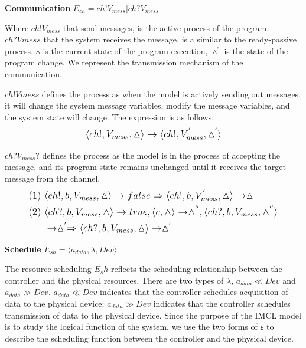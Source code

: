 \begin{definition} \textbf{Communication} $E_{ch} = ch!V_{mess} |ch?V_{mess}$ 
\end{definition}
Where $ch!V_{mess}$ that send messages, is the active process of the program. $ch?Vmess$ that the system receives the message, is a similar to the ready-passive process. $\vartriangle$  is the current state of the program execution, $\vartriangle^{'}$ is the state of the program change. We represent the transmission mechanism of the communication. 

$ch!Vmess$ defines the process as when the model is actively sending out messages, it will change the system message variables, modify the message variables, and the system state will change. The expression is as follows:
\begin{equation*}
    \normalsize
    \begin{aligned}
        \langle ch!, V_{mess}, \vartriangle \rangle \rightarrow \langle ch!, V_{mess}^{'}, \vartriangle^{'} \rangle
    \end{aligned}
\end{equation*}
 
$ch?V_{mess}?$ defines the process as the model is in the process of accepting the message, and its program state remains unchanged until it receives the target message from the channel.
\begin{equation*}
    \normalsize
    \begin{aligned}
        (1) \ & \langle ch!, b, V_{mess}, \vartriangle \rangle \rightarrow false \Rightarrow \langle ch!, b, V_{mess}^{'}, \vartriangle \rangle \rightarrow \vartriangle \\
        (2) \ & \langle ch?, b, V_{mess}, \vartriangle \rangle \rightarrow true, \langle c, \vartriangle \rangle \rightarrow \vartriangle^{''}, \langle ch?, b, V_{mess}, \vartriangle^{''} \rangle \\
         & \rightarrow \vartriangle^{'} \Rightarrow \langle ch?, b, V_{mess}, \vartriangle\rangle \rightarrow \vartriangle^{'}
    \end{aligned}
\end{equation*}

\begin{definition} \textbf{Schedule} $E_{sh} = \langle a_{data}, \lambda, Dev \rangle$
\end{definition}

The resource scheduling $E_sh$ reflects the scheduling relationship between the controller and the physical resources. There are two types of $\lambda$, $a_{data} \ll Dev$ and $a_{data} \gg Dev$. $a_{data} \ll Dev$ indicates that the controller schedules acquisition of data to the physical device; $a_{data} \gg Dev$ indicates that the controller schedules transmission of data to the physical device. Since the purpose of the IMCL model is to study the logical function of the system, we use the two forms of ε to describe the scheduling function between the controller and the physical device.

